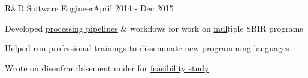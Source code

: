 \documentclass{article}
\newenvironment{**mylist}[2]{

\subsubsection*{#1\hfill#2}
  \small
  \begin{list}{}{}
    \setlength{\topsep}{0pt}
   \setlength{\itemsep}{1pt}
   \setlength{\parskip}{0pt}
   \setlength{\parsep}{0pt}}{\end{list}\normalsize}
\newcommand{\LU}[1]{\hspace{-1em}{\bf Technologies : #1}}
\def\PT{{\bf(Part Time)}\xspace}
\begin{document}
\begin{comment}
\begin{((mylist}{\href{http://pdxcodeguild.com/}{\bf{PDXCodeGuild}} \PT \tabb {\bf{June 2016}}}
\item Developed \& taught introductory \href{https://github.com/probinso/Intro-to-Python}{python course} material for coding boot-camp
\item \hspace{-1em}
\end{**mylist}
\end{comment}

\begin{**mylist}{ \tabb R\&D Software Engineer}{April 2014 - Dec 2015}
\item Developed \href{https://github.com/probinso/ppaml-eval-tools}{processing pipelines} \& workflows for  work on \href{https://www.darpa.mil/research/programs/probabilistic-programming-for-advancing-machine-Learning}{m}\href{https://galois.com/news/galois-awarded-10m-darpa-contract-make-legacy-systems-secure/}{u}\href{https://www.darpa.mil/program/safeware}{l}tiple  SBIR programs
\item Helped run professional trainings to disseminate new  programming languages
\item
  Wrote on disenfranchisement under \href{https://freeandfair.us/}{} for 
  \href{https://usvotefoundation-drupal.s3.amazonaws.com/prod/E2EVIV_nontechnical_audience_report.pdf}{feasibility study}
  \begin{comment}
\item Contributed to
  \censor{\href{http://www.darpa.mil/program/probabilistic-programming-for-advancing-machine-Learning}{PPAML}},
  \censor{\href{https://www.usvotefoundation.org/sites/default/files/E2EVIV_nontechnical_audience_report.pdf}{Overseas Voting Foundation}},
  \censor{\href{https://www.darpa.mil/program/safeware}{Safeware}},
  \censor{\href{https://rft.osrfoundation.org/index.html}{Robot Fast Track}}
  \end{comment}
\end{**mylist}
\end{document}
